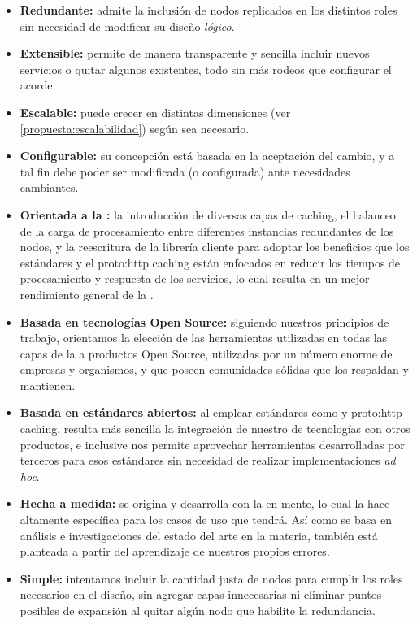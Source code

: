 \begin{itemize}
  \item \textbf{Redundante:} admite la inclusión de nodos replicados en los distintos roles sin necesidad de modificar su diseño \textit{lógico}.
  \item \textbf{Extensible:} permite de manera transparente y sencilla incluir nuevos servicios o quitar algunos existentes, todo sin más rodeos que configurar el  acorde.
  \item \textbf{Escalable:} puede crecer en distintas dimensiones (ver \autoref{propuesta:escalabilidad}) según sea necesario.
  \item \textbf{Configurable:} su concepción está basada en la aceptación del cambio, y a tal fin debe poder ser modificada (o configurada) ante necesidades cambiantes.
  \item \textbf{Orientada a la :} la introducción de diversas capas de caching, el balanceo de la carga de procesamiento entre diferentes instancias redundantes de los nodos, y la reescritura de la librería cliente para adoptar los beneficios que los estándares y el \gls{proto:http} caching están enfocados en reducir los tiempos de procesamiento y respuesta de los servicios, lo cual resulta en un mejor rendimiento general de la {\cloud}.
  \item \textbf{Basada en tecnologías Open Source:} siguiendo nuestros principios de trabajo, orientamos la elección de las herramientas utilizadas en todas las capas de la {\cloud} a productos Open Source, utilizadas por un número enorme de empresas y organismos, y que poseen comunidades sólidas que los respaldan y mantienen.
  \item \textbf{Basada en estándares abiertos:} al emplear estándares como  y \gls{proto:http} caching, resulta más sencilla la integración de nuestro  de tecnologías con otros productos, e inclusive nos permite aprovechar herramientas desarrolladas por terceros para esos estándares sin necesidad de realizar implementaciones \textit{ad hoc}.
  \item \textbf{Hecha a medida:} se origina y desarrolla con la {\cloud} en mente, lo cual la hace altamente específica para los casos de uso que tendrá. Así como se basa en análisis e investigaciones del estado del arte en la materia, también está planteada a partir del aprendizaje de nuestros propios errores.
  \item \textbf{Simple:} intentamos incluir la cantidad justa de nodos para cumplir los roles necesarios en el diseño, sin agregar capas innecesarias ni eliminar puntos posibles de expansión al quitar algún nodo que habilite la redundancia.

\end{itemize}
